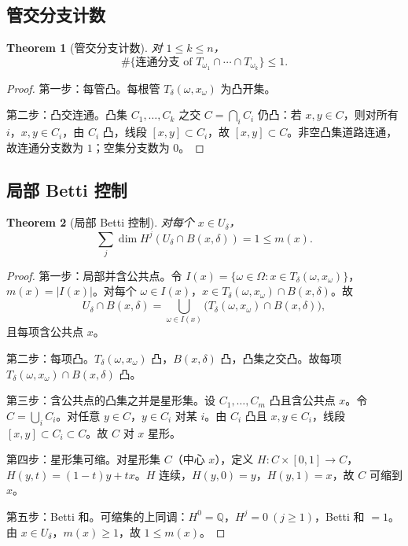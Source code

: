 \documentclass[11pt,a4paper]{article}
\newtheorem{theorem}{Theorem}[section]
\theoremstyle{remark}
\begin{document}
	\subsection{管交分支计数}
	\begin{theorem}[管交分支计数]
		对 $1\le k\le n$，
		\[
		\#\{\text{连通分支 of }T_{\omega_1}\cap\cdots\cap T_{\omega_k}\}\le1.
		\]
	\end{theorem}
	
	\begin{proof}
		第一步：每管凸。每根管 $T_\delta(\omega,x_\omega)$ 为凸开集。
		
		第二步：凸交连通。凸集 $C_1,\ldots,C_k$ 之交 $C=\bigcap_iC_i$ 仍凸：若 $x,y\in C$，则对所有 $i$，$x,y\in C_i$，由 $C_i$ 凸，线段 $[x,y]\subset C_i$，故 $[x,y]\subset C$。非空凸集道路连通，故连通分支数为 $1$；空集分支数为 $0$。
	\end{proof}
	
	\subsection{局部 Betti 控制}
	\begin{theorem}[局部 Betti 控制]
		对每个 $x\in U_\delta$，
		\[
		\sum_j\dim H^j(U_\delta\cap B(x,\delta))=1\le m(x).
		\]
	\end{theorem}
	
	\begin{proof}
		第一步：局部并含公共点。令 $I(x)=\{\omega\in\Omega:x\in T_\delta(\omega,x_\omega)\}$，$m(x)=|I(x)|$。对每个 $\omega\in I(x)$，$x\in T_\delta(\omega,x_\omega)\cap B(x,\delta)$。故
		\[
		U_\delta\cap B(x,\delta)=\bigcup_{\omega\in I(x)}\bigl(T_\delta(\omega,x_\omega)\cap B(x,\delta)\bigr),
		\]
		且每项含公共点 $x$。
		
		第二步：每项凸。$T_\delta(\omega,x_\omega)$ 凸，$B(x,\delta)$ 凸，凸集之交凸。故每项 $T_\delta(\omega,x_\omega)\cap B(x,\delta)$ 凸。
		
		第三步：含公共点的凸集之并是星形集。设 $C_1,\ldots,C_m$ 凸且含公共点 $x$。令 $C=\bigcup_iC_i$。对任意 $y\in C$，$y\in C_i$ 对某 $i$。由 $C_i$ 凸且 $x,y\in C_i$，线段 $[x,y]\subset C_i\subset C$。故 $C$ 对 $x$ 星形。
		
		第四步：星形集可缩。对星形集 $C$（中心 $x$），定义 $H:C\times[0,1]\to C$，$H(y,t)=(1-t)y+tx$。$H$ 连续，$H(y,0)=y$，$H(y,1)=x$，故 $C$ 可缩到 $x$。
		
		第五步：Betti 和。可缩集的上同调：$H^0=\mathbb Q$，$H^j=0\ (j\ge1)$，Betti 和 $=1$。由 $x\in U_\delta$，$m(x)\ge1$，故 $1\le m(x)$。
	\end{proof}
	
\end{document}

